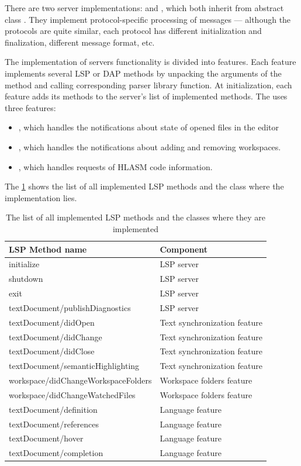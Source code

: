 There are two server implementations:  and , which both inherit from abstract class . They implement protocol-specific processing of messages --- although the protocols are quite similar, each protocol has different initialization and finalization, different message format, etc.

The implementation of servers functionality is divided into features. Each feature implements several LSP or DAP methods by unpacking the arguments of the method and calling corresponding parser library function. At initialization, each feature adds its methods to the server's list of implemented methods. The  uses three features:
\begin{itemize}
	\item {}, which handles the notifications about state of opened files in the editor
	\item {}, which handles the notifications about adding and removing workspaces.
	\item {}, which handles requests of HLASM code information.
\end{itemize}
The \cref{LSP_methods} shows the list of all implemented LSP methods and the class where the implementation lies.

\begin{longtable}{ll}
	\caption{The list of all implemented LSP methods and the classes where they are implemented}
	\label{LSP_methods}   \\ \toprule
	\textbf{LSP Method name} & \textbf{Component} \\ \midrule
	initialize  & LSP server     \\
	shutdown    & LSP server     \\
	exit        & LSP server    \\
	textDocument/publishDiagnostics & LSP server \\
	textDocument/didOpen  &  Text synchronization feature    \\
	textDocument/didChange  & Text synchronization feature     \\
	textDocument/didClose  &  Text synchronization feature    \\
	textDocument/semanticHighlighting & Text synchronization feature \\
	workspace/didChangeWorkspaceFolders  & Workspace folders feature     \\
	workspace/didChangeWatchedFiles  & Workspace folders feature     \\
	textDocument/definition  & Language feature     \\
	textDocument/references  & Language feature     \\
	textDocument/hover  & Language feature     \\
	textDocument/completion  & Language feature     \\ \bottomrule
\end{longtable}

